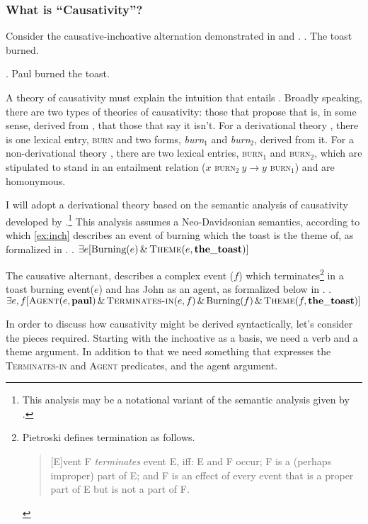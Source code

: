 \documentclass[letterpaper,12pt]{article}
\begin{document}
\subsubsection{What is ``Causativity''?}
Consider the causative-inchoative alternation demonstrated in \Next and \NNext.
\ex.\label{ex:inch} The toast burned.

\ex.\label{ex:caus} Paul burned the toast.

A theory of causativity must explain the intuition that \Last entails \LLast.
Broadly speaking, there are two types of theories of causativity: those that propose that \Last is, in some sense, derived from \LLast, that those that say it isn't.
For a derivational theory \parencite[e.g.][]{lakoff1976toward,hale1993argument,pietroski2003small}, there is one lexical entry, \textsc{burn} and two forms, \textit{burn}$_1$ and \textit{burn}$_2$, derived from it.
For a non-derivational theory \parencite[e.g.][]{fodor1970three}, there are two lexical entries, \textsc{burn}$_1$ and \textsc{burn$_2$}, which are stipulated to stand in an entailment relation ($x$ \textsc{burn}$_2\: y \rightarrow y$ \textsc{burn}$_1$) and are homonymous.

I will adopt a derivational theory based on the semantic analysis of causativity developed by \textcite{pietroski2003small}.\footnote{
  This analysis may be a notational variant of the semantic analysis given by \textcite{kratzer_building_2004}.
}
This analysis assumes a Neo-Davidsonian semantics, according to which \ref{ex:inch} describes an event of burning which the toast is the theme of, as formalized in \Next.
\ex. $\exists e [\text{Burning}(e)\, \&\, \textsc{Theme}(e, \mathbf{the\_toast})]$

The causative alternant, describes a complex event ($f$) which terminates\footnote{
  Pietroski defines termination as follows.
\begin{quote}
  [E]vent F \textit{terminates} event E, iff: E and F occur; F is a (perhaps improper) part of E; and F is an effect of every event that is a proper part of E but is not a part of F.\hfill\parencite[p190]{pietroski2003small}
\end{quote}
} in a toast burning event($e$) and has John as an agent, as formalized below in \Next.
\ex. $\exists e,f [ \textsc{Agent}(e, \mathbf{paul}) \,\&\, \textsc{Terminates-in}(e, f) \,\&\,\text{Burning}(f)\, \&\, \textsc{Theme}(f, \mathbf{the\_toast})]$

In order to discuss how causativity might be derived syntactically, let's consider the pieces required.
Starting with the inchoative as a basis, we need a verb and a theme argument.
In addition to that we need something that expresses the \textsc{Terminates-in} and \textsc{Agent} predicates, and the agent argument.
\end{document}
